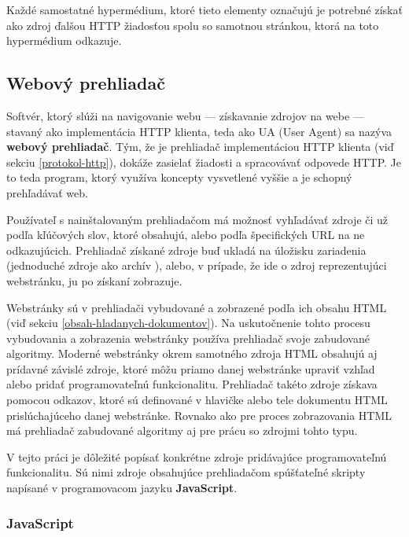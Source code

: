 Každé samostatné hypermédium, ktoré tieto elementy označujú je potrebné získať ako zdroj ďalšou HTTP žiadosťou spolu so samotnou stránkou, ktorá na toto hypermédium odkazuje.

\subsection{Webový prehliadač}
\label{webovy-prehliadac}


Softvér, ktorý slúži na navigovanie webu --- získavanie zdrojov na webe --- stavaný ako implementácia HTTP klienta, teda ako UA (User Agent) sa nazýva \textbf{webový prehliadač}. 
Tým, že je prehliadač implementáciou HTTP klienta (viď sekciu \ref{protokol-http}), dokáže zasielať žiadosti a spracovávať odpovede HTTP.
Je to teda program, ktorý využíva koncepty vysvetlené vyššie a je schopný prehľadávať web.

Používateľ s nainštalovaným prehliadačom má možnosť vyhľadávať zdroje či už podľa 
kľúčových slov, ktoré obsahujú, alebo podľa špecifických URL na ne odkazujúcich.
Prehliadač získané zdroje buď ukladá na úložisku zariadenia (jednoduché zdroje ako archív ), alebo, v prípade, že ide o zdroj reprezentujúci webstránku, ju po získaní zobrazuje.  

Webstránky sú v prehliadači vybudované a zobrazené podľa ich obsahu HTML (viď sekciu \ref{obsah-hladanych-dokumentov}).
Na uskutočnenie tohto procesu vybudovania a zobrazenia webstránky používa prehliadač svoje zabudované algoritmy.
Moderné webstránky okrem samotného zdroja HTML obsahujú aj prídavné závislé zdroje, ktoré môžu priamo danej webstránke upraviť vzhľad alebo pridať programovateľnú funkcionalitu.
Prehliadač takéto zdroje získava pomocou odkazov, ktoré sú definované v hlavičke alebo tele dokumentu HTML prislúchajúceho danej webstránke.
Rovnako ako pre proces zobrazovania HTML má prehliadač zabudované algoritmy aj pre prácu so zdrojmi tohto typu.

V tejto práci je dôležité popísať konkrétne zdroje pridávajúce programovateľnú funkcionalitu.
Sú nimi zdroje obsahujúce prehliadačom spúšťateľné skripty napísané v programovacom jazyku \textbf{JavaScript}.

\subsubsection{JavaScript}
\label{javascript}

